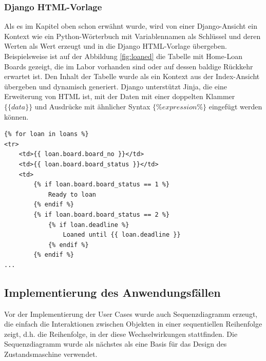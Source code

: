 \subsubsection{Django HTML-Vorlage}
\label{sec:server:design:templates}
Als es im Kapitel oben schon erwähnt wurde, wird von einer Django-Ansicht ein Kontext wie ein Python-Wörterbuch mit Variablennamen als Schlüssel und deren Werten als Wert erzeugt und in die Django HTML-Vorlage übergeben. Beispielsweise ist auf der Abbildung \ref{fig:loaned} die Tabelle mit Home-Loan Boards gezeigt, die im Labor vorhanden sind oder auf dessen baldige Rückkehr erwartet ist. Den Inhalt der Tabelle wurde als ein Kontext aus der Index-Ansicht übergeben und dynamisch generiert. Django unterstützt Jinja, die eine Erweiterung von HTML ist, mit der Daten mit einer doppelten Klammer $\{\{data\}\}$ und Ausdrücke mit ähnlicher Syntax $\{\% expression\%\}$ eingefügt werden können.

\begin{lstlisting}[caption={Django Template Sprache in index.html},captionpos=b]
{% for loan in loans %}
<tr>
	<td>{{ loan.board.board_no }}</td>
	<td>{{ loan.board.board_status }}</td>
	<td>
		{% if loan.board.board_status == 1 %}
			Ready to loan
		{% endif %}
		{% if loan.board.board_status == 2 %}
			{% if loan.deadline %}
				Loaned until {{ loan.deadline }}
			{% endif %}
		{% endif %}
...
\end{lstlisting}

\subsection{Implementierung des Anwendungsfällen}
\label{sec:server:fsm}
Vor der Implementierung der User Cases wurde auch Sequenzdiagramm erzeugt, die einfach die Interaktionen zwischen Objekten in einer sequentiellen Reihenfolge zeigt, d.h. die Reihenfolge, in der diese Wechselwirkungen stattfinden. Die Sequenzdiagramm wurde als nächstes als eine Basis für das Design des Zustandsmaschine verwendet.  

